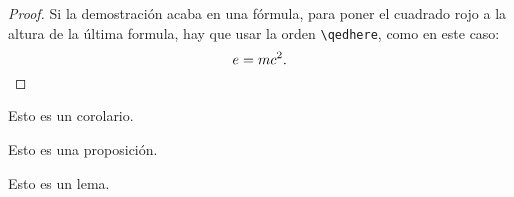 \documentclass[12pt, twoside]{book}
\begin{document}
\begin{proof}
    Si la demostración acaba en una fórmula, para poner el cuadrado rojo a la altura de la última formula, hay que usar la orden \verb|\qedhere|, como en este caso:
    \[
        e=mc^{2}.\qedhere
    \]

\end{proof}


\begin{corollary}\label{cor:1}
    Esto es un corolario.
\end{corollary}

\begin{proposition}\label{pro:1}
    Esto es una proposición.
\end{proposition}

\begin{lemma}[Gauss]\label{lem:1}
    Esto es un lema.
\end{lemma}



\backmatter
%


\end{document}
